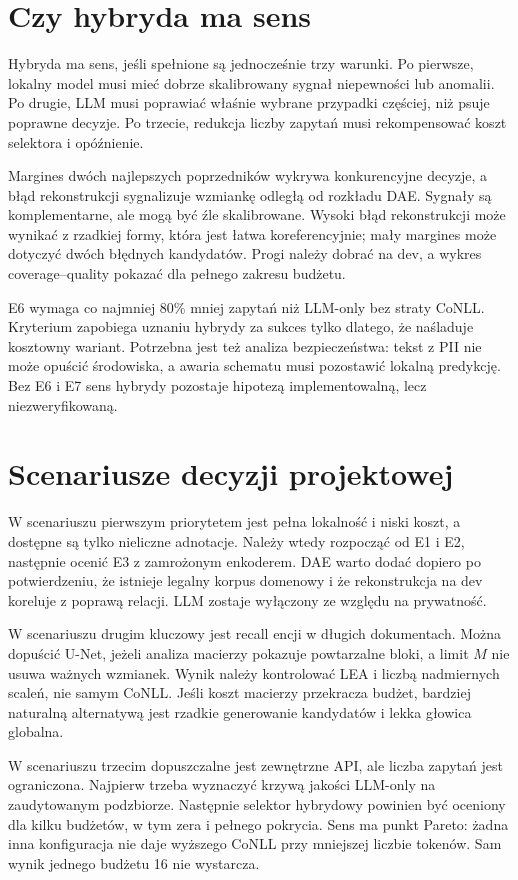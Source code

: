 \section{Czy hybryda ma sens}

Hybryda ma sens, jeśli spełnione są jednocześnie trzy warunki. Po pierwsze, lokalny model musi mieć dobrze skalibrowany sygnał niepewności lub anomalii. Po drugie, LLM musi poprawiać właśnie wybrane przypadki częściej, niż psuje poprawne decyzje. Po trzecie, redukcja liczby zapytań musi rekompensować koszt selektora i opóźnienie.

Margines dwóch najlepszych poprzedników wykrywa konkurencyjne decyzje, a błąd rekonstrukcji sygnalizuje wzmiankę odległą od rozkładu DAE. Sygnały są komplementarne, ale mogą być źle skalibrowane. Wysoki błąd rekonstrukcji może wynikać z rzadkiej formy, która jest łatwa koreferencyjnie; mały margines może dotyczyć dwóch błędnych kandydatów. Progi należy dobrać na dev, a wykres coverage--quality pokazać dla pełnego zakresu budżetu.

E6 wymaga co najmniej 80\% mniej zapytań niż LLM-only bez straty CoNLL. Kryterium zapobiega uznaniu hybrydy za sukces tylko dlatego, że naśladuje kosztowny wariant. Potrzebna jest też analiza bezpieczeństwa: tekst z PII nie może opuścić środowiska, a awaria schematu musi pozostawić lokalną predykcję. Bez E6 i E7 sens hybrydy pozostaje hipotezą implementowalną, lecz niezweryfikowaną.

\section{Scenariusze decyzji projektowej}

W scenariuszu pierwszym priorytetem jest pełna lokalność i niski koszt, a dostępne są tylko nieliczne adnotacje. Należy wtedy rozpocząć od E1 i E2, następnie ocenić E3 z zamrożonym enkoderem. DAE warto dodać dopiero po potwierdzeniu, że istnieje legalny korpus domenowy i że rekonstrukcja na dev koreluje z poprawą relacji. LLM zostaje wyłączony ze względu na prywatność.

W scenariuszu drugim kluczowy jest recall encji w długich dokumentach. Można dopuścić U-Net, jeżeli analiza macierzy pokazuje powtarzalne bloki, a limit $M$ nie usuwa ważnych wzmianek. Wynik należy kontrolować LEA i liczbą nadmiernych scaleń, nie samym CoNLL. Jeśli koszt macierzy przekracza budżet, bardziej naturalną alternatywą jest rzadkie generowanie kandydatów i lekka głowica globalna.

W scenariuszu trzecim dopuszczalne jest zewnętrzne API, ale liczba zapytań jest ograniczona. Najpierw trzeba wyznaczyć krzywą jakości LLM-only na zaudytowanym podzbiorze. Następnie selektor hybrydowy powinien być oceniony dla kilku budżetów, w tym zera i pełnego pokrycia. Sens ma punkt Pareto: żadna inna konfiguracja nie daje wyższego CoNLL przy mniejszej liczbie tokenów. Sam wynik jednego budżetu 16 nie wystarcza.


